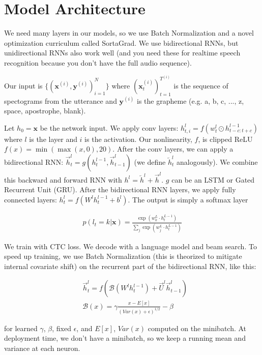 \documentclass[a4paper]{article}
\begin{document}
\section{Model Architecture}
We need many layers in our models, so we use Batch Normalization and a novel
optimization curriculum called SortaGrad. We use bidirectional RNNs, but
unidirectional RNNs also work well (and you need these for realtime speech
recognition because you don't have the full audio sequence).

Our input is $\{(\mathbf{x}^{(i)}, \mathbf{y}^{(i)})_{i=1}^{N}\}$ where
$(\mathbf{x}^{(i)}_t)_{t=1}^{T^{(i)}}$ is the sequence of spectograms from
the utterance and $\mathbf{y}^{(i)}$ is the grapheme (e.g. a, b, c, ..., z,
space, apostrophe, blank).

Let $h_0 = \mathbf{x}$ be the network input. We apply conv layers:
$h_{t, i}^{l} = f(w_t^{l} \odot h_{t-c:t+c}^{l-1})$ where $l$ is the layer
and $i$ is the activation. Our nonlinearity, $f$, is clipped ReLU
$f(x) = \min(\max(x, 0), 20)$. After the conv layers, we can apply a
bidirectional RNN: $\overrightarrow{h}_t^{l} = g(h_t^{l-1},
\overrightarrow{h}_{t-1}^{l})$ (we define $\overleftarrow{h}_t^{l}$
analogously). We combine this backward and forward RNN with $h^l =
\overleftarrow{h}^l + \overrightarrow{h}^l$. $g$ can be an LSTM or Gated
Recurrent Unit (GRU). After the bidirectional RNN layers, we apply fully
connected layers: $h_t^l = f(W^l h_t^{l-1} + b^l)$. The output is simply
a softmax layer

\begin{align}
p(l_t = k | \mathbf{x}) = \frac{\exp(w_k^L \cdot h_t^{L-1})}{
\sum_{j}{\exp(w_j^L \cdot h_t^{L-1})}}
\end{align}

We train with CTC loss. We decode with a language model and beam search. To
speed up training, we use Batch Normalization (this is theorized to mitigate
internal covariate shift) on the recurrent part of the bidirectional RNN, like
this:

\begin{align}
  & \overrightarrow{h}_t^l = f(
    \mathcal{B}(W^l h_t^{l-1}) +
    \overrightarrow{U}^l \overrightarrow{h}_{t-1}^l
  ) \\
  & \mathcal{B}(x) = \gamma \frac{x - E[x]}{(Var(x) + \epsilon)^{1/2}} - \beta
\end{align}

for learned $\gamma$, $\beta$, fixed $\epsilon$, and $E[x]$, $Var(x)$ computed
on the minibatch. At deployment time, we don't have a minibatch, so we keep
a running mean and variance at each neuron.
\end{document}
